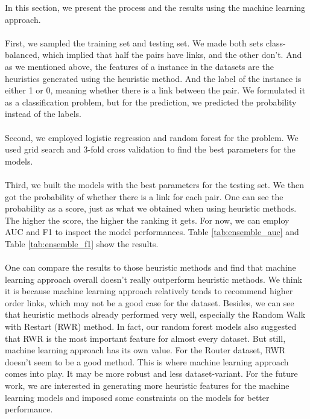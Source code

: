 \documentclass[12pt]{article}
\begin{document}
In this section, we present the process and the results using the machine learning approach. 
\\
\\
First, we sampled the training set and testing set. We made both sets class-balanced, which implied that half the pairs have links, and the other don't. And as we mentioned above, the features of a instance in the datasets are the heuristics generated using the heuristic method. And the label of the instance is either 1 or 0, meaning whether there is a link between the pair. We formulated it as a classification problem, but for the prediction, we predicted the probability instead of the labels. 
\\
\\
Second, we employed logistic regression and random forest for the problem. We used grid search and 3-fold cross validation to find the best parameters for the models.
\\
\\
Third, we built the models with the best parameters for the testing set. We then got the probability of whether there is a link for each pair. One can see the probability as a score, just as what we obtained when using heuristic methods. The higher the score, the higher the ranking it gets. For now, we can employ AUC and F1 to inspect the model performances. Table \ref{tab:ensemble_auc} and Table \ref{tab:ensemble_f1} show the results.
\\
\\
One can compare the results to those heuristic methods and find that machine learning approach overall doesn't really outperform heuristic methods. We think it is because machine learning approach relatively tends to recommend higher order links, which may not be a good case for the dataset. Besides, we can see that heuristic methods already performed very well, especially the Random Walk with Restart (RWR) method. In fact, our random forest models also suggested that RWR is the most important feature for almost every dataset. But still, machine learning approach has its own value. For the Router dataset, RWR doesn't seem to be a good method. This is where machine learning approach comes into play. It may be more robust and less dataset-variant. For the future work, we are interested in generating more heuristic features for the machine learning models and imposed some constraints on the models for better performance. 
\end{document}
